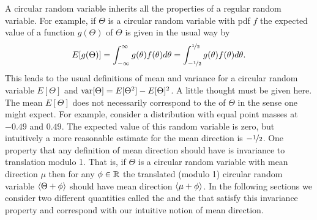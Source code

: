 \documentclass[journal]{IEEEtran}
\begin{document}
A circular random variable inherits all the properties of a regular random variable.  For example, if $\Theta$ is a circular random variable with pdf $f$ the expected value of a function $g(\Theta)$ of $\Theta$ is given in the usual way by
\[
E[g(\Theta)] = \int_{-\infty}^{\infty}g(\theta)f(\theta)d\theta = \int_{-\nicefrac{1}{2}}^{\nicefrac{1}{2}}g(\theta)f(\theta)d\theta.
\]
This leads to the usual definitions of mean and variance for a circular random variable $E[\Theta]$ and $\operatorname{var}[\Theta] = E[\Theta^2] - E[\Theta]^2$.  A little thought must be given here. The mean $E[\Theta]$ does not necessarily correspond to the  of $\Theta$ in the sense one might expect.  For example, consider a distribution with equal point masses at $-0.49$ and $0.49$.  The expected value of this random variable is zero, but intuitively a more reasonable estimate for the mean direction is $-\nicefrac{1}{2}$.  One property that any definition of mean direction should have is invariance to translation modulo 1.  That is, if $\Theta$ is a circular random variable with mean direction $\mu$ then for any $\phi \in {\mathbb R}$ the translated (modulo 1) circular random variable $\left< \Theta + \phi \right>$ should have mean direction $\left< \mu + \phi \right>$.  In the following sections we consider two different quantities called the  and the  that satisfy this invariance property and correspond with our intuitive notion of mean direction.


%
\end{document}
